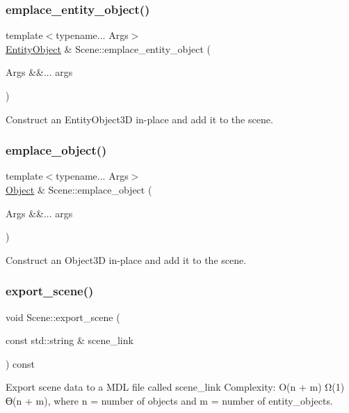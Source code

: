 \subsubsection{\texorpdfstring{emplace\+\_\+entity\+\_\+object()}{emplace\_entity\_object()}}
{\footnotesize\ttfamily template$<$typename... Args$>$ \\
\mbox{\hyperlink{class_entity_object}{Entity\+Object}} \& Scene\+::emplace\+\_\+entity\+\_\+object (\begin{DoxyParamCaption}\item[{Args \&\&...}]{args }\end{DoxyParamCaption})}

Construct an Entity\+Object3D in-\/place and add it to the scene. \mbox{\label{class_scene_a5875b3cf7be811378d53f0fba76cb181}} 
\subsubsection{\texorpdfstring{emplace\+\_\+object()}{emplace\_object()}}
{\footnotesize\ttfamily template$<$typename... Args$>$ \\
\mbox{\hyperlink{class_object}{Object}} \& Scene\+::emplace\+\_\+object (\begin{DoxyParamCaption}\item[{Args \&\&...}]{args }\end{DoxyParamCaption})}

Construct an Object3D in-\/place and add it to the scene. \mbox{\label{class_scene_a65b10c0a127b5f811869a605b70c5a72}} 
\subsubsection{\texorpdfstring{export\+\_\+scene()}{export\_scene()}}
{\footnotesize\ttfamily void Scene\+::export\+\_\+scene (\begin{DoxyParamCaption}\item[{const std\+::string \&}]{scene\+\_\+link }\end{DoxyParamCaption}) const}

Export scene data to a M\+DL file called scene\+\_\+link Complexity\+: O(n + m) Ω(1) ϴ(n + m), where n = number of objects and m = number of entity\+\_\+objects. \mbox{\label{class_scene_afd60d93bcc462b387402ba01b4f108fb}} 
